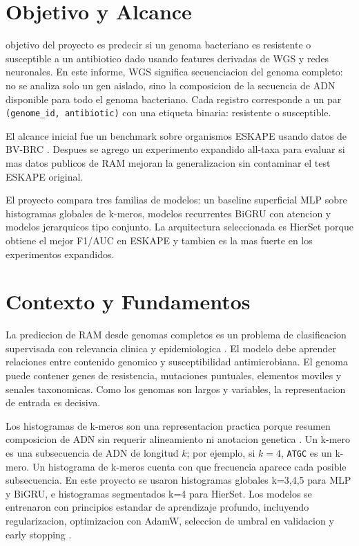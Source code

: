 \documentclass[journal,transmag]{../ieee_latex_template/IEEEtran}
\begin{document}
\maketitle
\IEEEdisplaynontitleabstractindextext
\IEEEpeerreviewmaketitle

\section{Objetivo y Alcance}
 objetivo del proyecto es predecir si un genoma bacteriano es resistente o susceptible a un antibiotico dado usando features derivadas de WGS y redes neuronales. En este informe, WGS significa secuenciacion del genoma completo: no se analiza solo un gen aislado, sino la composicion de la secuencia de ADN disponible para todo el genoma bacteriano. Cada registro corresponde a un par \texttt{(genome\_id, antibiotic)} con una etiqueta binaria: resistente o susceptible.

El alcance inicial fue un benchmark sobre organismos ESKAPE usando datos de BV-BRC \cite{olson2023bvbrc}. Despues se agrego un experimento expandido all-taxa para evaluar si mas datos publicos de RAM mejoran la generalizacion sin contaminar el test ESKAPE original.

El proyecto compara tres familias de modelos: un baseline superficial MLP sobre histogramas globales de k-meros, modelos recurrentes BiGRU con atencion y modelos jerarquicos tipo conjunto. La arquitectura seleccionada es HierSet porque obtiene el mejor F1/AUC en ESKAPE y tambien es la mas fuerte en los experimentos expandidos.

\section{Contexto y Fundamentos}
La prediccion de RAM desde genomas completos es un problema de clasificacion supervisada con relevancia clinica y epidemiologica \cite{boolchandani2019,koser2014,ren2022}. El modelo debe aprender relaciones entre contenido genomico y susceptibilidad antimicrobiana. El genoma puede contener genes de resistencia, mutaciones puntuales, elementos moviles y senales taxonomicas. Como los genomas son largos y variables, la representacion de entrada es decisiva.

Los histogramas de k-meros son una representacion practica porque resumen composicion de ADN sin requerir alineamiento ni anotacion genetica \cite{compeau2014}. Un k-mero es una subsecuencia de ADN de longitud $k$; por ejemplo, si $k=4$, \texttt{ATGC} es un k-mero. Un histograma de k-meros cuenta con que frecuencia aparece cada posible subsecuencia. En este proyecto se usaron histogramas globales k=3,4,5 para MLP y BiGRU, e histogramas segmentados k=4 para HierSet. Los modelos se entrenaron con principios estandar de aprendizaje profundo, incluyendo regularizacion, optimizacion con AdamW, seleccion de umbral en validacion y early stopping \cite{haykin2009,goodfellow2016,srivastava2014,loshchilov2019}.
\end{document}

